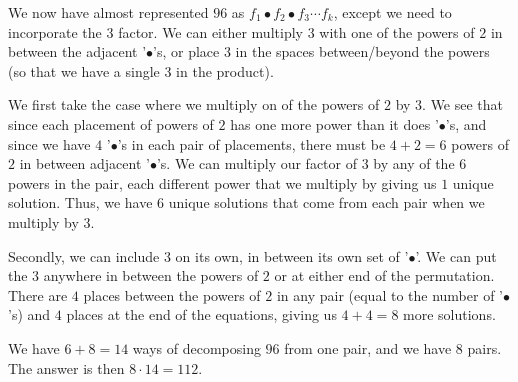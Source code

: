 \begin{enumerate}
 We now have almost represented $96$ as $f_1 \bullet f_2 \bullet f_3\cdots f_k$, except we need to incorporate the 3 factor.  We can either multiply $3$ with one of the powers of $2$ in between the adjacent '$\bullet$'s, or place $3$ in the spaces between/beyond the powers (so that we have a single $3$ in the product).  

 We first take the case where we multiply on of the powers of $2$ by $3$. We see that since each placement of powers of $2$ has one more power than it does '$\bullet$'s, and since we have $4$ '$\bullet$'s in each pair of placements, there must be $4+2=6$ powers of $2$ in between adjacent '$\bullet$'s.  We can multiply our factor of $3$ by any of the $6$ powers in the pair, each different power that we multiply by giving us $1$ unique solution.  Thus, we have $6$ unique solutions that come from each pair when we multiply by $3$.

 Secondly, we can include $3$ on its own, in between its own set of '$\bullet$'.  We can put the $3$ anywhere in between the powers of $2$ or at either end of the permutation.  There are $4$ places between the powers of $2$ in any pair (equal to the number of '$\bullet$'s) and $4$ places at the end of the equations, giving us $4+4=8$ more solutions.

 We have $6+8=14$ ways of decomposing $96$ from one pair, and we have $8$ pairs.  The answer is then $8\cdot 14=112$.

 


 


 


\end{enumerate}